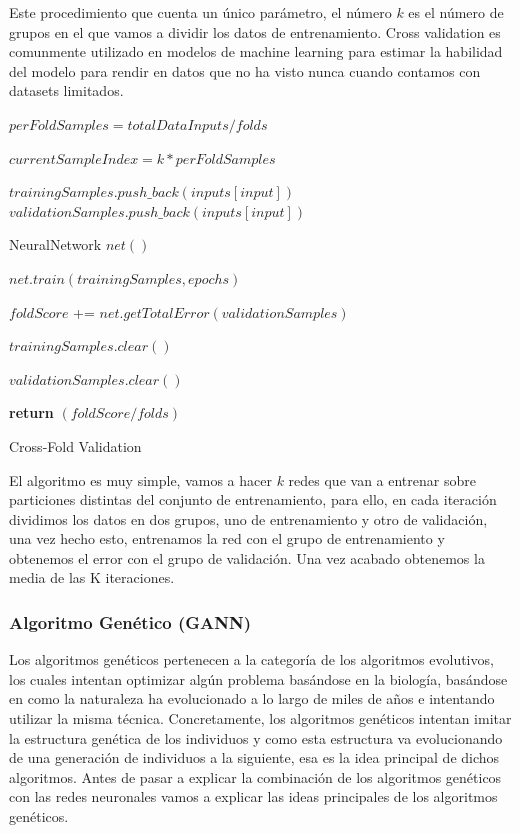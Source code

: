 Este procedimiento que cuenta un único parámetro, el número $k$ es el número de grupos en el que vamos a dividir los datos de entrenamiento. Cross validation es comunmente utilizado en modelos de machine learning para estimar la habilidad del modelo para rendir en datos que no ha visto nunca cuando contamos con datasets limitados.

\begin{algorithm}
     $perFoldSamples = totalDataInputs / folds$
     
     {
        $currentSampleIndex = k * perFoldSamples$
        
        {
            {
                $trainingSamples.push\_back(inputs[input])$
            }
            {
                $validationSamples.push\_back(inputs[input])$
            }   
        }
        
        NeuralNetwork $net()$
        
        $net.train(trainingSamples, epochs)$
        
        $foldScore$ += $net.getTotalError(validationSamples)$
        
        $trainingSamples.clear()$
        
        $validationSamples.clear()$
     }
     
     \textbf{return} $(foldScore / folds)$
    
	\caption{Cross-Fold Validation}
	\label{alg:crossval}
\end{algorithm}

El algoritmo es muy simple, vamos a hacer $k$ redes que van a entrenar sobre particiones distintas del conjunto de entrenamiento, para ello, en cada iteración dividimos los datos en dos grupos, uno de entrenamiento y otro de validación, una vez hecho esto, entrenamos la red con el grupo de entrenamiento y obtenemos el error con el grupo de validación. Una vez acabado obtenemos la media de las K iteraciones.

\newpage
\subsubsection{Algoritmo Genético (GANN)}
\label{subsubsec:nn:gann}

Los algoritmos genéticos pertenecen a la categoría de los algoritmos evolutivos, los cuales intentan optimizar algún problema basándose en la biología, basándose en como la naturaleza ha evolucionado a lo largo de miles de años e intentando utilizar la misma técnica. Concretamente, los algoritmos genéticos intentan imitar la estructura genética de los individuos y como esta estructura va evolucionando de una generación de individuos a la siguiente, esa es la idea principal de dichos algoritmos. Antes de pasar a explicar la combinación de los algoritmos genéticos con las redes neuronales vamos a explicar las ideas principales de los algoritmos genéticos.

